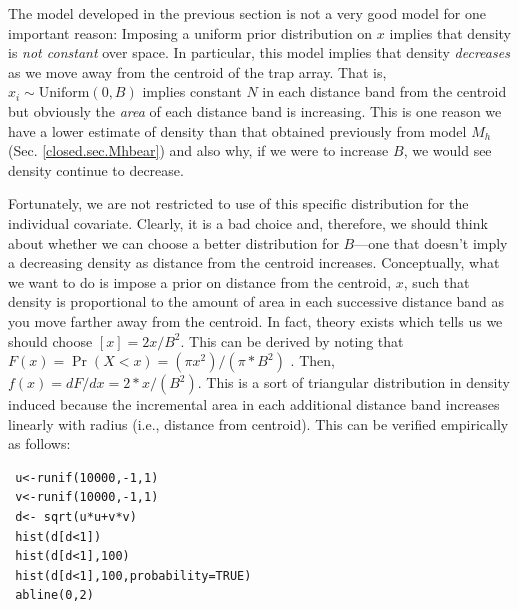 The model developed in the previous section is not a very good model
for one important reason: Imposing a uniform prior distribution on $x$
implies that density is {\it not constant} over space. In particular,
this model implies that density {\it decreases} as we move away from the
centroid of the trap array.  That is, $x_{i} \sim \mbox{Uniform}(0,B)$
implies constant $N$ in each distance band from the centroid but
obviously the {\it area} of each distance band is increasing.  This is
one reason we have a lower estimate of density than that obtained
previously from model $M_h$ (Sec. \ref{closed.sec.Mhbear}) and also
why, if we were to increase $B$, we would see density continue to
decrease.

Fortunately, we are not
restricted to use of this specific distribution for the individual
covariate. Clearly, it is a bad choice and, therefore, we should think
about whether we can choose a better distribution for $B$---one that
doesn't imply a decreasing density as distance from the centroid
increases.  Conceptually, what we want to do is impose a prior on
distance from the centroid, $x$, such that density is proportional to
the amount of area in each successive distance band as you move
farther away from the centroid.  In fact, theory exists which tells us
we should choose $[x] = 2x/B^2$. This can be derived
by noting that $F(x) = \Pr(X<x) = (\pi x^2)/(\pi*B^{2})$ . Then, $f(x)
= dF/dx = 2*x/(B^{2})$. This is a sort of triangular distribution in
density induced because the incremental area in each additional
distance band increases linearly with radius (i.e., distance from
centroid). This can be verified empirically as follows:
{\small
\begin{verbatim}
 u<-runif(10000,-1,1)
 v<-runif(10000,-1,1)
 d<- sqrt(u*u+v*v)
 hist(d[d<1])
 hist(d[d<1],100)
 hist(d[d<1],100,probability=TRUE)
 abline(0,2)
\end{verbatim}
}

